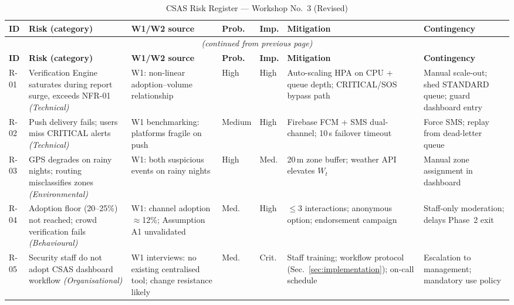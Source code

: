 \documentclass[12pt,a4paper]{article}
\begin{document}
{\footnotesize
\begin{longtable}{p{0.5cm}p{4.2cm}p{2.8cm}p{0.9cm}p{0.9cm}p{3.5cm}p{2.5cm}}
\caption{CSAS Risk Register --- Workshop No.\ 3 (Revised)}\label{tab:risks}\\
\toprule
\textbf{ID} & \textbf{Risk (category)} & \textbf{W1/W2 source} & \textbf{Prob.} & \textbf{Imp.} & \textbf{Mitigation} & \textbf{Contingency} \\
\midrule
\endfirsthead
\multicolumn{7}{c}{\small\textit{(continued from previous page)}}\\
\toprule
\textbf{ID} & \textbf{Risk (category)} & \textbf{W1/W2 source} & \textbf{Prob.} & \textbf{Imp.} & \textbf{Mitigation} & \textbf{Contingency} \\
\midrule
\endhead
\bottomrule
\endlastfoot

R-01 & Verification Engine saturates during report surge, exceeds NFR-01 \textit{(Technical)} & W1: non-linear adoption--volume relationship & High & High & Auto-scaling HPA on CPU + queue depth; CRITICAL/SOS bypass path & Manual scale-out; shed STANDARD queue; guard dashboard entry \\[4pt]

R-02 & Push delivery fails; users miss CRITICAL alerts \textit{(Technical)} & W1 benchmarking: platforms fragile on push & Medium & High & Firebase FCM + SMS dual-channel; 10\,s failover timeout & Force SMS; replay from dead-letter queue \\[4pt]

R-03 & GPS degrades on rainy nights; routing misclassifies zones \textit{(Environmental)} & W1: both suspicious events on rainy nights & High & Med. & 20\,m zone buffer; weather API elevates $W_t$ & Manual zone assignment in dashboard \\[4pt]

R-04 & Adoption floor (20--25\%) not reached; crowd verification fails \textit{(Behavioural)} & W1: channel adoption $\approx$12\%; Assumption A1 unvalidated & Med. & High & $\leq$3 interactions; anonymous option; endorsement campaign & Staff-only moderation; delays Phase~2 exit \\[4pt]

R-05 & Security staff do not adopt CSAS dashboard workflow \textit{(Organisational)} & W1 interviews: no existing centralised tool; change resistance likely & Med. & Crit. & Staff training; workflow protocol (Sec.~\ref{sec:implementation}); on-call schedule & Escalation to management; mandatory use policy \\[4pt]


\end{longtable}}
\end{document}
